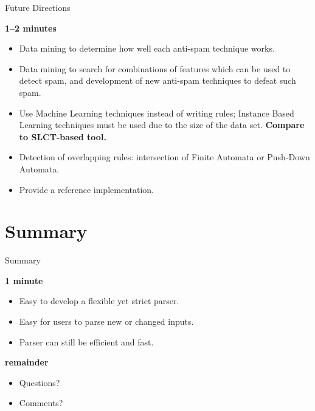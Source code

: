 \documentclass{beamer}
\newcommand{\timingnote}[1]{%
    \textbf{#1}%
}
\begin{document}
\begin{frame}{Future Directions}

    \timingnote{1--2 minutes}

    \begin{itemize}

        \item Data mining to determine how well each anti-spam technique
            works.

        \item Data mining to search for combinations of features which can
            be used to detect spam, and development of new anti-spam
            techniques to defeat such spam.

        \item Use Machine Learning techniques instead of writing rules;
            Instance Based Learning techniques must be used due to the size
            of the data set.  \timingnote{Compare to SLCT-based tool.}

        \item Detection of overlapping rules: intersection of Finite
            Automata or Push-Down Automata.

        \item Provide a reference implementation.

    \end{itemize}

\end{frame}


\section{Summary}

\begin{frame}{Summary}

    \timingnote{1 minute}

    \begin{itemize}

        \item Easy to develop a flexible yet strict parser.

        \item Easy for users to parse new or changed inputs.

        \item Parser can still be efficient and fast.

    \end{itemize}

    \timingnote{remainder}

    \begin{itemize}

        \item Questions?

        \item Comments?

    \end{itemize}

\end{frame}
\end{document}

